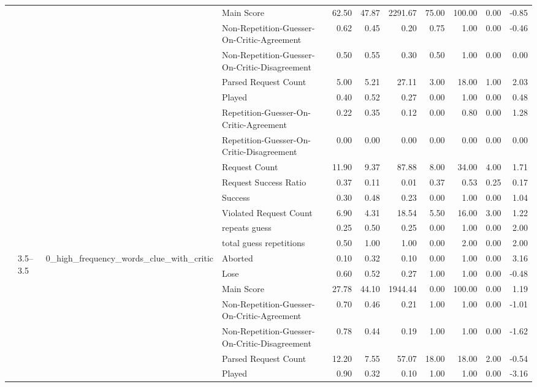 \begin{tabular}{llllrrrrrrr}
 &  &  & Main Score & 62.50 & 47.87 & 2291.67 & 75.00 & 100.00 & 0.00 & -0.85 \\
 &  &  & Non-Repetition-Guesser-On-Critic-Agreement & 0.62 & 0.45 & 0.20 & 0.75 & 1.00 & 0.00 & -0.46 \\
 &  &  & Non-Repetition-Guesser-On-Critic-Disagreement & 0.50 & 0.55 & 0.30 & 0.50 & 1.00 & 0.00 & 0.00 \\
 &  &  & Parsed Request Count & 5.00 & 5.21 & 27.11 & 3.00 & 18.00 & 1.00 & 2.03 \\
 &  &  & Played & 0.40 & 0.52 & 0.27 & 0.00 & 1.00 & 0.00 & 0.48 \\
 &  &  & Repetition-Guesser-On-Critic-Agreement & 0.22 & 0.35 & 0.12 & 0.00 & 0.80 & 0.00 & 1.28 \\
 &  &  & Repetition-Guesser-On-Critic-Disagreement & 0.00 & 0.00 & 0.00 & 0.00 & 0.00 & 0.00 & 0.00 \\
 &  &  & Request Count & 11.90 & 9.37 & 87.88 & 8.00 & 34.00 & 4.00 & 1.71 \\
 &  &  & Request Success Ratio & 0.37 & 0.11 & 0.01 & 0.37 & 0.53 & 0.25 & 0.17 \\
 &  &  & Success & 0.30 & 0.48 & 0.23 & 0.00 & 1.00 & 0.00 & 1.04 \\
 &  &  & Violated Request Count & 6.90 & 4.31 & 18.54 & 5.50 & 16.00 & 3.00 & 1.22 \\
 &  &  & repeats guess & 0.25 & 0.50 & 0.25 & 0.00 & 1.00 & 0.00 & 2.00 \\
 &  &  & total guess repetitions & 0.50 & 1.00 & 1.00 & 0.00 & 2.00 & 0.00 & 2.00 \\
\cline{2-11} \cline{3-11}
 & \multirow[t]{45}{*}{3.5--3.5} & \multirow[t]{15}{*}{0_high_frequency_words_clue_with_critic} & Aborted & 0.10 & 0.32 & 0.10 & 0.00 & 1.00 & 0.00 & 3.16 \\
 &  &  & Lose & 0.60 & 0.52 & 0.27 & 1.00 & 1.00 & 0.00 & -0.48 \\
 &  &  & Main Score & 27.78 & 44.10 & 1944.44 & 0.00 & 100.00 & 0.00 & 1.19 \\
 &  &  & Non-Repetition-Guesser-On-Critic-Agreement & 0.70 & 0.46 & 0.21 & 1.00 & 1.00 & 0.00 & -1.01 \\
 &  &  & Non-Repetition-Guesser-On-Critic-Disagreement & 0.78 & 0.44 & 0.19 & 1.00 & 1.00 & 0.00 & -1.62 \\
 &  &  & Parsed Request Count & 12.20 & 7.55 & 57.07 & 18.00 & 18.00 & 2.00 & -0.54 \\
 &  &  & Played & 0.90 & 0.32 & 0.10 & 1.00 & 1.00 & 0.00 & -3.16 \\

\end{tabular}

